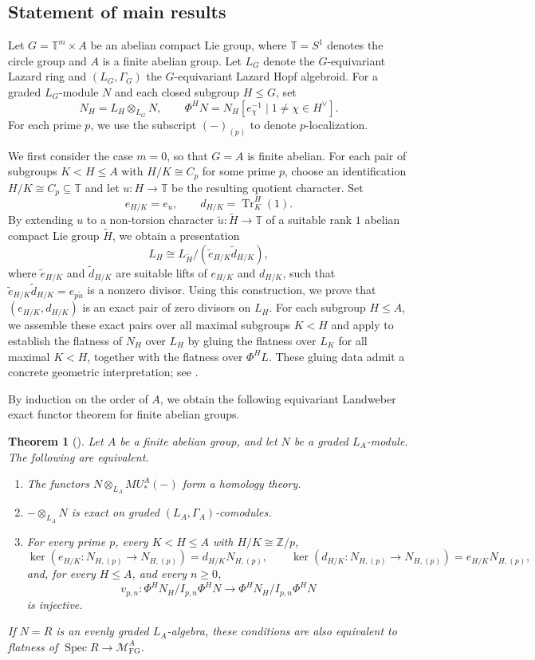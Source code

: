 \documentclass[11pt,reqno]{amsart}
\newtheorem{theorem}{Theorem}[section]
\newcommand{\Spec}{\operatorname{Spec}}
\newcommand{\MFG}{\mathcal M_{\mathrm{FG}}}
\newcommand{\bbT}{\mathbb T}
\newcommand{\bbZ}{\mathbb Z}
\newcommand{\tensor}{\otimes}
\begin{document}
\subsection{Statement of main results}
Let $G=\bbT^m\times A$ be an abelian compact Lie group, where $\bbT=S^1$ denotes the circle group and $A$ is a finite abelian group. Let $L_G$ denote the $G$-equivariant Lazard ring and $(L_G,\Gamma_G)$ the $G$-equivariant Lazard Hopf algebroid. For a graded $L_G$-module $N$ and each closed subgroup $H\leq G$, set
\[
N_H=L_H\tensor_{L_G}N,
\qquad
\Phi^H N=N_H[e_\chi^{-1}\mid 1\neq\chi\in H^\vee].
\]
For each prime $p$, we use the subscript $(-)_{(p)}$ to denote $p$-localization.

We first consider the case $m=0$, so that $G=A$ is finite abelian. For each pair of subgroups $K<H\leq A$ with $H/K\cong C_p$ for some prime $p$, choose an identification $H/K\cong C_p\subseteq\bbT$ and let $u\colon H\to\bbT$ be the resulting quotient character. Set
\[
e_{H/K}=e_u,
\qquad
d_{H/K}=\operatorname{Tr}_K^H(1).
\]
By extending $u$ to a non-torsion character $\widetilde u\colon\widetilde H\to\bbT$ of a suitable rank $1$ abelian compact Lie group $\widetilde H$, we obtain a presentation
\[
L_H\cong L_{\widetilde H}/(\widetilde e_{H/K}\widetilde d_{H/K}),
\]
where $\widetilde e_{H/K}$ and $\widetilde d_{H/K}$ are suitable lifts of $e_{H/K}$ and $d_{H/K}$, such that $\widetilde e_{H/K}\widetilde d_{H/K}=e_{p\widetilde u}$ is a nonzero divisor. Using this construction, we prove that $(e_{H/K},d_{H/K})$ is an exact pair of zero divisors on $L_H$. For each subgroup $H\leq A$, we assemble these exact pairs over all maximal subgroups $K<H$ and apply  to establish the flatness of $N_H$ over $L_H$ by gluing the flatness over $L_K$ for all maximal $K<H$, together with the flatness over $\Phi^H L$. These gluing data admit a concrete geometric interpretation; see .


By induction on the order of $A$, we obtain the following equivariant Landweber exact functor theorem for finite abelian groups.

\begin{theorem}[]\label{Introthm:finite}
Let $A$ be a finite abelian group, and let $N$ be a graded $L_{A}$-module.  The following are equivalent.
\begin{enumerate}[label=\textup{(\roman*)}]
\item The functors $N\tensor_{L_{A}} MU_*^A(-)$ form a homology theory.
\item $-\tensor_{L_{A}}N$ is exact on graded $(L_{A},\Gamma_{A})$-comodules.
\item For every prime $p$, every $K<H\leq A$ with $H/K\cong \bbZ/p$,
\[
\ker(e_{H/K}:N_{H,(p)}\to N_{H,(p)})=d_{H/K}N_{H,(p)}, \qquad \ker(d_{H/K}:N_{H,(p)}\to N_{H,(p)})=e_{H/K}N_{H,(p)},
\]
and, for every $H\leq A$, and every $n\geq0$,
\[
  v_{p,n}:\Phi^H N_H/I_{p,n}\Phi^H N \longrightarrow \Phi^H N_H/I_{p,n}\Phi^H N
\]
is injective.
\end{enumerate}
If $N=R$ is an evenly graded $L_{A}$-algebra, these conditions are also equivalent to flatness of $\Spec R\to\MFG^A$.
\end{theorem}
\end{document}
